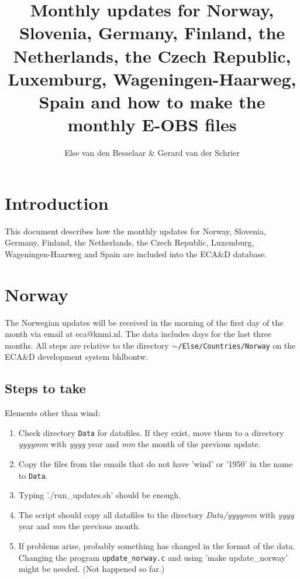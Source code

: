 \documentclass[a4paper]{article}
\title{Monthly updates for Norway, Slovenia, Germany, Finland, the Netherlands, the Czech Republic, Luxemburg,
Wageningen-Haarweg, Spain 
and how to make the monthly E-OBS files}
\author{Else van den Besselaar \& Gerard van der Schrier}
\begin{document}
\maketitle


\section{Introduction}
This document describes how the monthly updates for Norway, Slovenia,
Germany, Finland, the Netherlands, the Czech Republic, Luxemburg, Wageningen-Haarweg and Spain
are included into the ECA\&D database.


\section{Norway}

The Norwegian updates will be received in the morning of the first day
of the month via email at eca@knmi.nl. The data includes days for the
last three months. All steps are relative to the directory
\texttt{$\sim$/Else/Countries/Norway} on the ECA\&D development system
bhlbontw.

\subsection*{Steps to take}

Elements other than wind:
\begin{enumerate}
\item Check directory \texttt{Data} for datafiles. If they exist, move
  them to a directory \textit{yyyymm} with \textit{yyyy} year and
  \textit{mm} the month of the previous update.
\item Copy the files from the emails that do not have 'wind' or '1950'
  in the name to \texttt{Data}.
\item Typing './run\_updates.sh' should be enough. 
\item The script should copy all datafiles to the directory
  \textit{Data/yyyymm} with \textit{yyyy} year and \textit{mm} the
  previous month.
\item If problems arise, probably something has changed in the format
  of the data. Changing the program \texttt{update\_norway.c} and
  using 'make update\_norway' might be needed. (Not happened so far.)
\end{enumerate}
\end{document}

